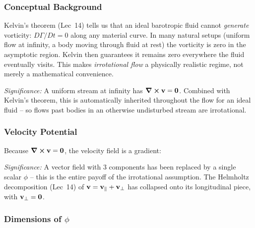 \documentclass[../main.tex]{subfiles}
\begin{document}
\subsubsection*{Conceptual Background}
Kelvin's theorem (Lec~14) tells us that an ideal barotropic fluid cannot \emph{generate} vorticity: $D\Gamma/Dt=0$ along any material curve. In many natural setups (uniform flow at infinity, a body moving through fluid at rest) the vorticity is zero in the asymptotic region. Kelvin then guarantees it remains zero everywhere the fluid eventually visits. This makes \emph{irrotational flow} a physically realistic regime, not merely a mathematical convenience.

\textit{Significance:} A uniform stream at infinity has $\curl\mathbf{v}=\mathbf{0}$. Combined with Kelvin's theorem, this is automatically inherited throughout the flow for an ideal fluid -- so flows past bodies in an otherwise undisturbed stream are irrotational.

\subsubsection{Velocity Potential}

Because $\curl\mathbf{v} = \mathbf{0}$, the velocity field is a gradient:

\textit{Significance:} A vector field with $3$ components has been replaced by a single scalar $\phi$ -- this is the entire payoff of the irrotational assumption. The Helmholtz decomposition (Lec~14) of $\mathbf{v}=\mathbf{v}_\parallel+\mathbf{v}_\perp$ has collapsed onto its longitudinal piece, with $\mathbf{v}_\perp=\mathbf{0}$.

\subsubsection{Dimensions of $\phi$}
\end{document}

